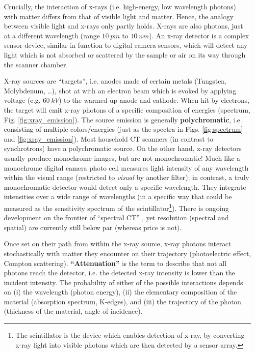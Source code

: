 \begin{change}
Crucially, the interaction of x-rays (i.e. high-energy, low wavelength photons) with matter differs from that of visible light and matter.
Hence, the analogy between visible light and x-rays only partly holds.
X-rays \citep{Berger2018,Buzug2008} are also photons, just at a different wavelength (range \(10\ pm\) to \(10\ nm\)).
An x-ray detector is a complex sensor device, similar in function to digital camera sensors, which will detect any light which is not absorbed or scattered by the sample or air on its way through the scanner chamber.
\end{change}
X-ray sources are ``targets'', i.e. anodes made of certain metals (Tungsten, Molybdenum, \ldots{}), shot at with an electron beam which is evoked by applying voltage (e.g. \(60\ kV\)) to the warmed-up anode and cathode.
When hit by electrons, the target will emit x-ray photons of a specific composition of energies (spectrum, Fig. \ref{fig:xray_emission}).
The source emission is generally \textbf{polychromatic}, i.e. consisting of multiple colors/energies (just as the spectra in Figs. \ref{fig:spectrum} and \ref{fig:xray_emission}).
Most household CT scanners (in contrast to synchrotrons) have a polychromatic source.
On the other hand, x-ray detectors usually produce monochrome images, but are not monochromatic!
Much like a monochrome digital camera photo cell measures light intensity of any wavelength within the visual range (restricted to \emph{visual} by another filter); in contrast, a truly monochromatic detector would detect only a specific wavelength.
They integrate intensities over a wide range of wavelengths (in a specific way that could be measured as the sensitivity spectrum of the scintillator\footnote{The scintillator is the device which enables detection of x-ray, by converting x-ray light into visible photons which are then detected by a sensor array.}).
There is ongoing development on the frontier of ``spectral CT'' \citep{Liu2023}, yet resolution (spectral and spatial) are currently still below par (whereas price is not).


\begin{change}
Once set on their path from within the x-ray source, x-ray photons interact stochastically with matter they encounter on their trajectory (photoelectric effect, Compton scattering).
\textbf{``Attenuation''} is the term to describe that not all photons reach the detector, i.e. the detected x-ray intensity is lower than the incident intensity.
The probability of either of the possible interactions depends on (i) the wavelength (photon energy), (ii) the elementary composition of the material (absorption spectrum, K-edges), and (iii) the trajectory of the photon (thickness of the material, angle of incidence).
\end{change}

